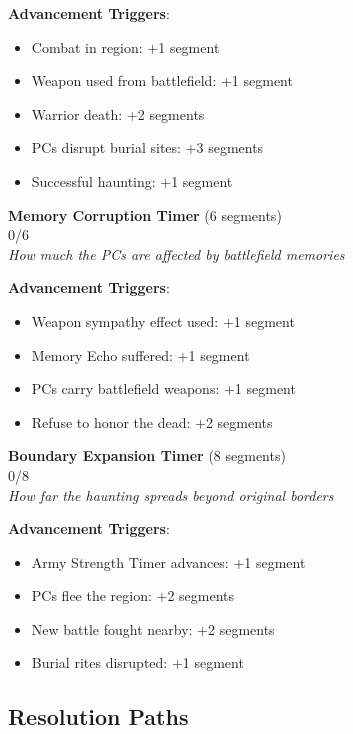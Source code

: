 \documentclass[11pt]{article}
\newcommand{\timersegment}{\textbullet}
\begin{document}
\textbf{Advancement Triggers}:
\begin{itemize}[leftmargin=*]
\item Combat in region: +1 segment
\item Weapon used from battlefield: +1 segment
\item Warrior death: +2 segments
\item PCs disrupt burial sites: +3 segments
\item Successful haunting: +1 segment
\end{itemize}

\begin{center}
\textbf{Memory Corruption Timer } (6 segments)\\
\fbox{\timersegment\timersegment\timersegment\timersegment\timersegment\timersegment} 0/6\\
\textit{How much the PCs are affected by battlefield memories}
\end{center}

\textbf{Advancement Triggers}:
\begin{itemize}[leftmargin=*]
\item Weapon sympathy effect used: +1 segment
\item Memory Echo suffered: +1 segment
\item PCs carry battlefield weapons: +1 segment
\item Refuse to honor the dead: +2 segments
\end{itemize}

\begin{center}
\textbf{Boundary Expansion Timer } (8 segments)\\
\fbox{\timersegment\timersegment\timersegment\timersegment\timersegment\timersegment\timersegment\timersegment} 0/8\\
\textit{How far the haunting spreads beyond original borders}
\end{center}

\textbf{Advancement Triggers}:
\begin{itemize}[leftmargin=*]
\item Army Strength Timer advances: +1 segment
\item PCs flee the region: +2 segments
\item New battle fought nearby: +2 segments
\item Burial rites disrupted: +1 segment
\end{itemize}

\subsection*{Resolution Paths}
\end{document}
